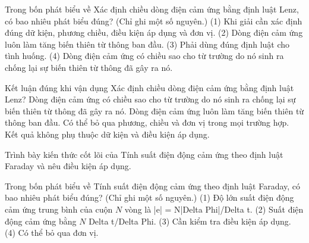 \begin{ex}
Trong bốn phát biểu về Xác định chiều dòng điện cảm ứng bằng định luật Lenz, có bao nhiêu phát biểu đúng? (Chỉ ghi một số nguyên.) (1) Khi giải cần xác định đúng dữ kiện, phương chiều, điều kiện áp dụng và đơn vị. (2) Dòng điện cảm ứng luôn làm tăng biến thiên từ thông ban đầu. (3) Phải dùng đúng định luật cho tình huống. (4) Dòng điện cảm ứng có chiều sao cho từ trường do nó sinh ra chống lại sự biến thiên từ thông đã gây ra nó.
\end{ex}

\begin{ex}
Kết luận đúng khi vận dụng Xác định chiều dòng điện cảm ứng bằng định luật Lenz?
\choice
{\True Dòng điện cảm ứng có chiều sao cho từ trường do nó sinh ra chống lại sự biến thiên từ thông đã gây ra nó.}
{Dòng điện cảm ứng luôn làm tăng biến thiên từ thông ban đầu.}
{Có thể bỏ qua phương, chiều và đơn vị trong mọi trường hợp.}
{Kết quả không phụ thuộc dữ kiện và điều kiện áp dụng.}
\end{ex}

\begin{bt}
Trình bày kiến thức cốt lõi của Tính suất điện động cảm ứng theo định luật Faraday và nêu điều kiện áp dụng.
\end{bt}

\begin{ex}
Trong bốn phát biểu về Tính suất điện động cảm ứng theo định luật Faraday, có bao nhiêu phát biểu đúng? (Chỉ ghi một số nguyên.) (1) Độ lớn suất điện động cảm ứng trung bình của cuộn $N$ vòng là |e| = N|Delta Phi|/Delta t. (2) Suất điện động cảm ứng bằng $N$ Delta t/Delta Phi. (3) Cần kiểm tra điều kiện áp dụng. (4) Có thể bỏ qua đơn vị.
\end{ex}

